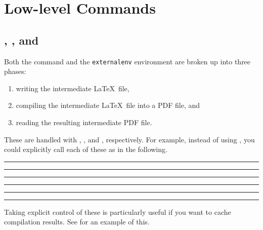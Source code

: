 \documentclass[10pt]{ltxdoc}
\newcommand{\env}[1]{\texttt{#1}}
\def\gauge{%
  \rule{0.2em}{7pt}%
  \llap{\rule[8pt]{0.2em}{2pt}}%
}
\begin{document}
\section{Low-level Commands}
\label{sec:Low-level Commands}

\subsection{, , and }
\label{subsec:ExternalWrite, ExternalCompile, and ExternalRead}




Both the  command and the \env{externalenv} environment
are broken up into three phases:
\begin{enumerate}
\item writing the intermediate \LaTeX\ file,
\item compiling the intermediate \LaTeX\ file into a PDF file, and
\item reading the resulting intermediate PDF file.
\end{enumerate}

These are handled with , , and
, respectively.
For example, instead of using , you could explicitly call
each of these as in the following.

\begin{tcblisting}{}
\gauge
{}%
\gauge

\gauge\ExternalCompile[file=example-external-separate]\gauge

\gauge\ExternalRead[file=example-external-separate]\gauge
\end{tcblisting}

Taking explicit control of these is particularly useful if you want to
cache compilation results.
See  for an example of this.

\subsection{}
\label{subsec:ExternalCode}
\end{document}
